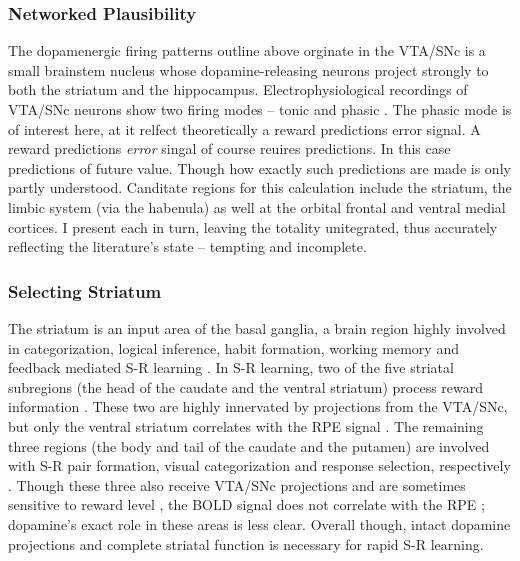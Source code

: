 \documentclass[doc,12pt]{apa}        %
\begin{document}
\subsubsection{Networked Plausibility}
\label{sub:net_plaus}
The dopamenergic firing patterns outline above orginate in the VTA/SNc is a small brainstem nucleus whose dopamine-releasing neurons project strongly to both the striatum and the hippocampus.  Electrophysiological recordings of VTA/SNc neurons show two firing modes -- tonic and phasic \cite{DawNW:2006p6343}.  The phasic mode is of interest here, at it relfect theoretically a reward predictions error signal. A reward predictions \emph{error} singal of course reuires predictions.  In this case predictions of future value.  Though how exactly such predictions are made is only partly understood.  Canditate regions for this calculation include the striatum, the limbic system (via the habenula) as well at the orbital frontal and ventral medial cortices.  I present each in turn, leaving the totality unitegrated, thus accurately reflecting the literature's state -- tempting and incomplete.

\subsubsection{Selecting Striatum}
\label{sub:sel_str}
The striatum is an input area of the basal ganglia, a brain region highly involved in categorization, logical inference, habit formation, working memory and feedback mediated S-R learning \cite{Frank:2001p1996,Jin:2010p7199,SchmitzerTorbert:2004p5410,Seger:2008p6401,Seger:2010p7189,Yin:2006p5080}.  In S-R learning, two of the five striatal subregions (the head of the caudate and the ventral striatum) process reward information \cite{Yin:2005p5101,Yin:2008p6347,Schonberg:2009p6669}.  These two are highly innervated by projections from the VTA/SNc, but only the ventral striatum correlates with the RPE signal \cite{Haruno:2006p3979,Seger:2010p7189}.  The remaining three regions (the body and tail of the caudate and the putamen) are involved with S-R pair formation, visual categorization and response selection, respectively \cite{Seger:2008p6401,Seger:2010p7189}.  Though these three also receive VTA/SNc projections and are sometimes sensitive to reward level \cite{BischoffGrethe:2009p4570}, the BOLD signal does not correlate with the RPE \cite{Seger:2010p7189}; dopamine's exact role in these areas is less clear.  Overall though, intact dopamine projections and complete striatal function is necessary for rapid S-R learning.
   
\end{document}
